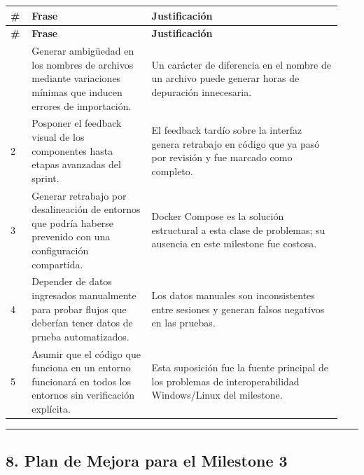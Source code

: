 \documentclass[11pt,a4paper]{article}
\begin{document}
\begingroup
\scriptsize
\setlength{\tabcolsep}{3pt}
\begin{longtable}{P{0.06\linewidth}P{0.34\linewidth}P{0.54\linewidth}}
\toprule
\textbf{\#} & \textbf{Frase} & \textbf{Justificación} \\
\midrule
\endfirsthead
\toprule
\textbf{\#} & \textbf{Frase} & \textbf{Justificación} \\
\midrule
\endhead
\bottomrule
{} & Generar ambigüedad en los nombres de archivos mediante variaciones mínimas que inducen errores de importación. & Un carácter de diferencia en el nombre de un archivo puede generar horas de depuración innecesaria. \\
2 & Posponer el feedback visual de los componentes hasta etapas avanzadas del sprint. & El feedback tardío sobre la interfaz genera retrabajo en código que ya pasó por revisión y fue marcado como completo. \\
3 & Generar retrabajo por desalineación de entornos que podría haberse prevenido con una configuración compartida. & Docker Compose es la solución estructural a esta clase de problemas; su ausencia en este milestone fue costosa. \\
4 & Depender de datos ingresados manualmente para probar flujos que deberían tener datos de prueba automatizados. & Los datos manuales son inconsistentes entre sesiones y generan falsos negativos en las pruebas. \\
5 & Asumir que el código que funciona en un entorno funcionará en todos los entornos sin verificación explícita. & Esta suposición fue la fuente principal de los problemas de interoperabilidad Windows/Linux del milestone. \\
\end{longtable}
\endgroup

\vspace{0.6em}\hrule\vspace{0.8em}

\subsection{8. Plan de Mejora para el Milestone 3}
\end{document}
